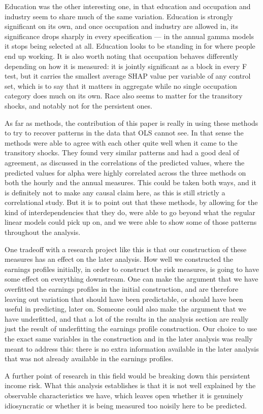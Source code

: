 \documentclass[12pt]{article}
\begin{document}
\begin{onehalfspace}
Education was the other interesting one, in that education and occupation and industry seem to share much of the same variation. Education is strongly significant on its own, and once occupation and industry are allowed in, its significance drops sharply in every specification --- in the annual gamma models it stops being selected at all. Education looks to be standing in for where people end up working. It is also worth noting that occupation behaves differently depending on how it is measured: it is jointly significant as a block in every F test, but it carries the smallest average SHAP value per variable of any control set, which is to say that it matters in aggregate while no single occupation category does much on its own. Race also seems to matter for the transitory shocks, and notably not for the persistent ones.

As far as methods, the contribution of this paper is really in using these methods to try to recover patterns in the data that OLS cannot see. In that sense the methods were able to agree with each other quite well when it came to the transitory shocks. They found very similar patterns and had a good deal of agreement, as discussed in the correlations of the predicted values, where the predicted values for alpha were highly correlated across the three methods on both the hourly and the annual measures. This could be taken both ways, and it is definitely not to make any causal claim here, as this is still strictly a correlational study. But it is to point out that these methods, by allowing for the kind of interdependencies that they do, were able to go beyond what the regular linear models could pick up on, and we were able to show some of those patterns throughout the analysis.

One tradeoff with a research project like this is that our construction of these measures has an effect on the later analysis. How well we constructed the earnings profiles initially, in order to construct the risk measures, is going to have some effect on everything downstream. One can make the argument that we have overfitted the earnings profiles in the initial construction, and are therefore leaving out variation that should have been predictable, or should have been useful in predicting, later on. Someone could also make the argument that we have underfitted, and that a lot of the results in the analysis section are really just the result of underfitting the earnings profile construction. Our choice to use the exact same variables in the construction and in the later analysis was really meant to address this: there is no extra information available in the later analysis that was not already available in the earnings profiles.

A further point of research in this field would be breaking down this persistent income risk. What this analysis establishes is that it is not well explained by the observable characteristics we have, which leaves open whether it is genuinely idiosyncratic or whether it is being measured too noisily here to be predicted.


\end{onehalfspace}
\end{document}

